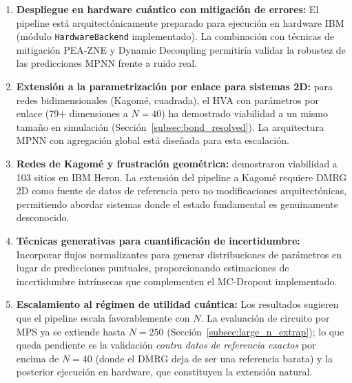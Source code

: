 \documentclass[11pt,a4paper,spanish]{book}
\begin{document}
\begin{enumerate}
    \item \textbf{Despliegue en hardware cuántico con mitigación de errores:} El pipeline está arquitectónicamente preparado para ejecución en hardware IBM (módulo \texttt{HardwareBackend} implementado). La combinación con técnicas de mitigación PEA-ZNE \citep{kim2023} y Dynamic Decoupling \citep{pokharel2025} permitiría validar la robustez de las predicciones MPNN frente a ruido real.

    \item \textbf{Extensión a la parametrización por enlace para sistemas 2D:} para redes bidimensionales (Kagomé, cuadrada), el HVA con parámetros por enlace (79+ dimensiones a $N = 40$) ha demostrado viabilidad a un mismo tamaño en simulación (Sección~\ref{subsec:bond_resolved}). La arquitectura MPNN con agregación global está diseñada para esta escalación.

    \item \textbf{Redes de Kagomé y frustración geométrica:} \citet{ahsan2025} demostraron viabilidad a 103 sitios en IBM Heron. La extensión del pipeline a Kagomé requiere DMRG 2D como fuente de datos de referencia pero no modificaciones arquitectónicas, permitiendo abordar sistemas donde el estado fundamental es genuinamente desconocido.

    \item \textbf{Técnicas generativas para cuantificación de incertidumbre:} Incorporar flujos normalizantes \citep{zou2026} para generar distribuciones de parámetros en lugar de predicciones puntuales, proporcionando estimaciones de incertidumbre intrínsecas que complementen el MC-Dropout \citep{gal2016} implementado.

    \item \textbf{Escalamiento al régimen de utilidad cuántica:} Los resultados sugieren que el pipeline escala favorablemente con $N$. La evaluación de circuito por MPS ya se extiende hasta $N = 250$ (Sección~\ref{subsec:large_n_extrap}); lo que queda pendiente es la validación \emph{contra datos de referencia exactos} por encima de $N = 40$ (donde el DMRG deja de ser una referencia barata) y la posterior ejecución en hardware, que constituyen la extensión natural.


\end{enumerate}
\end{document}
